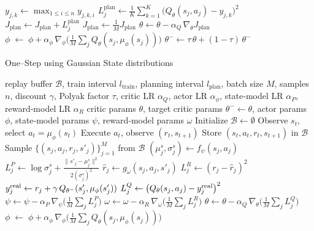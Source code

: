 \documentclass[11pt,a4paper]{report}
\begin{document}
\begin{algorithm}[ht]
\begin{algorithmic}[1]
        \EndFor
        \State $y_{j,k}\gets \max_{1\le i\le n}y_{j,k,i}$
      \EndFor
      \State $L^{\text{plan}}_j \gets \frac{1}{K}\sum_{k=1}^K \bigl(Q_\theta(s_j,a_j)-y_{j,k}\bigr)^2$
      \State $J_{\text{plan}}\gets J_{\text{plan}}+L^{\text{plan}}_j$
    \EndFor
    \State $J_{\text{plan}}\gets \frac{1}{M}J_{\text{plan}}$
    \State $\theta \!\gets\! \theta - \alpha_Q\,\nabla_\theta J_{\text{plan}}$
    \State $\phi \;\gets\;\phi + \alpha_\phi\,\nabla_\phi\bigl(\frac{1}{M}\sum_j Q_\theta(s_j,\mu_\phi(s_j))\bigr)$
    \State $\theta^- \!\gets\! \tau\,\theta + (1-\tau)\,\theta^-$
  \EndIf
\EndFor
\end{algorithmic}
\end{algorithm}

\begin{algorithm}[ht]
\caption{One–Step using Gaussian State distributions}
\label{alg:one_step_det_reward_separate}
\begin{algorithmic}[1]
\Require 
  replay buffer $\mathcal B$, train interval $l_{\text{train}}$, planning interval $l_{\text{plan}}$, batch size $M$, samples $n$, discount $\gamma$, Polyak factor $\tau$,  
  critic LR $\alpha_Q$, actor LR $\alpha_\phi$,  
  state‐model LR $\alpha_P$, reward‐model LR $\alpha_R$
\Ensure 
  critic params $\theta$, target critic params $\theta^-\!\gets\theta$, actor params $\phi$,  
  state‐model params $\psi$, reward‐model params $\omega$
\State Initialize $\mathcal B\gets\emptyset$
  \State Observe $s_t$, select $a_t=\mu_\phi(s_t)$
  \State Execute $a_t$, observe $(r_t,s_{t+1})$
  \State Store $(s_t,a_t,r_t,s_{t+1})$ in $\mathcal B$
   
    \State Sample $\{(s_j,a_j,r_j,s'_j)\}_{j=1}^M$ from $\mathcal B$
      \State $(\mu^s_j,\sigma^s_j)\gets f_\psi(s_j,a_j)$
      \State $L^P_j \gets \log\sigma^s_j + \frac{\|s'_j-\mu^s_j\|^2}{2(\sigma^s_j)^2}$
      \State $\hat r_j \gets g_\omega(s_j,a_j,s'_j)$
      \State $L^R_j \gets (r_j - \hat r_j)^2$
      \State $y^{\rm real}_j \gets r_j + \gamma\,Q_{\theta^-}(s'_j,\mu_\phi(s'_j))$
      \State $L^Q_j \gets \bigl(Q_\theta(s_j,a_j) - y^{\rm real}_j\bigr)^2$
    \EndFor
    \State $\psi \!\gets\! \psi - \alpha_P\,\nabla_\psi\bigl(\tfrac{1}{M}\sum_j L^P_j\bigr)$
    \State $\omega \!\gets\! \omega - \alpha_R\,\nabla_\omega\bigl(\tfrac{1}{M}\sum_j L^R_j\bigr)$
    \State $\theta \!\gets\! \theta - \alpha_Q\,\nabla_\theta\bigl(\tfrac{1}{M}\sum_j L^Q_j\bigr)$
    \State $\phi \;\gets\;\phi + \alpha_\phi\,\nabla_\phi\bigl(\tfrac{1}{M}\sum_j Q_\theta(s_j,\mu_\phi(s_j))\bigr)$

\end{algorithmic}
\end{algorithm}
\end{document}
